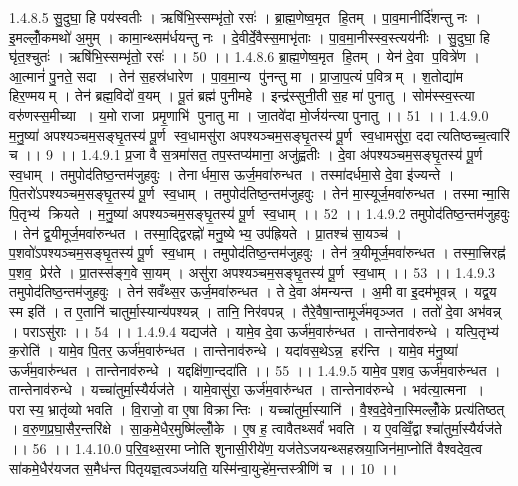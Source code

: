 1.4.8.5
सु॒दुघा॒ हि पय॑स्वतीः । ऋषि॑भि॒स्सम्भृ॑तो॒ रसः॑ । ब्रा॒ह्म॒णेष्व॒मृत॑ हि॒तम् । पा॒व॒मानीर्दि॑शन्तु नः । इ॒मल्लोँ॒कमथो॑ अ॒मुम् । कामा॒न्थ्सम॑र्धयन्तु नः । दे॒वीर्दे॒वैस्स॒माभृ॑ताः । पा॒व॒मा॒नीस्स्व॒स्त्यय॑नीः । सु॒दुघा॒ हि घृ॑त॒श्चुतः॑ । ऋषि॑भि॒स्सम्भृ॑तो॒ रसः॑ ।। 50 ।।
1.4.8.6
ब्रा॒ह्म॒णेष्व॒मृत॑ हि॒तम् । येन॑ दे॒वा प॒वित्रे॑ण । आ॒त्मानं॑ पु॒नते॒ सदा । तेन॑ स॒हस्र॑धारेण । पा॒व॒मा॒न्य पु॑नन्तु मा । प्रा॒जा॒प॒त्यं प॒वित्रम् । श॒तोद्या॑म हिर॒ण्मयम् । तेन॑ ब्रह्म॒विदो॑ व॒यम् । पू॒तं ब्रह्म॑ पुनीमहे । इन्द्र॑स्सुनी॒ती स॒ह मा॑ पुनातु । सोम॑स्स्व॒स्त्या वरु॑णस्स॒मीच्या । य॒मो राजा प्रमृ॒णाभि॑ पुनातु मा । जा॒तवे॑दा मो॒र्जय॑न्त्या पुनातु ।। 51 ।।
1.4.9.0
म॒नु॒ष्या॑ अपश्यञ्चम॒सङ्घृ॒तस्य॑ पू॒र्ण स्व॒धामसु॑रा अपश्यञ्चम॒सङ्घृ॒तस्य॑ पू॒र्ण स्व॒धामसु॑रा॒ ददात्यतिष्ठच्च॒त्वारि॑ च ।। 9 ।।
1.4.9.1
प्र॒जा वै स॒त्रमा॑सत॒ तप॒स्तप्य॑माना॒ अजु॑ह्वतीः । दे॒वा अ॑पश्यञ्चम॒सङ्घृ॒तस्य॑ पू॒र्ण स्व॒धाम् । तमुपोद॑तिष्ठ॒न्तम॑जुहवुः । तेनार्धमा॒स ऊर्ज॒मवा॑रुन्धत । तस्मा॑दर्धमा॒से दे॒वा इ॑ज्यन्ते । पि॒तरो॑ऽपश्यञ्चम॒सङ्घृ॒तस्य॑ पू॒र्ण स्व॒धाम् । तमुपोद॑तिष्ठ॒न्तम॑जुहवुः । तेन॑ मा॒स्यूर्ज॒मवा॑रुन्धत । तस्मान्मा॒सि पि॒तृभ्य॑ क्रियते । म॒नु॒ष्या॑ अपश्यञ्चम॒सङ्घृ॒तस्य॑ पू॒र्ण स्व॒धाम् ।। 52 ।।
1.4.9.2
तमुपोद॑तिष्ठ॒न्तम॑जुहवुः । तेन॑ द्व॒यीमूर्ज॒मवा॑रुन्धत । तस्मा॒द्द्विरह्नो॑ मनु॒ष्येभ्य॒ उप॑ह्रियते । प्रा॒तश्च॑ सा॒यञ्च॑ । प॒शवो॑ऽपश्यञ्चम॒सङ्घृ॒तस्य॑ पू॒र्ण स्व॒धाम् । तमुपोद॑तिष्ठ॒न्तम॑जुहवुः । तेन॑ त्र॒यीमूर्ज॒मवा॑रुन्धत । तस्मा॒त्त्रिरह्न॑ प॒शव॒ प्रेर॑ते । प्रा॒तस्स॑ङ्ग॒वे सा॒यम् । असु॑रा अपश्यञ्चम॒सङ्घृ॒तस्य॑ पू॒र्ण स्व॒धाम् ।। 53 ।।
1.4.9.3
तमुपोद॑तिष्ठ॒न्तम॑जुहवुः । तेन॑ सवँथ्स॒र ऊर्ज॒मवा॑रुन्धत । ते दे॒वा अ॑मन्यन्त । अ॒मी वा इ॒दम॑भूवन्न् । यद्व॒य स्म इति॑ । त ए॒तानि॑ चातुर्मा॒स्यान्य॑पश्यन्न् । तानि॒ निर॑वपन्न् । तैरे॒वैषा॒न्तामूर्ज॑मवृञ्जत । ततो॑ दे॒वा अभ॑वन्न् । पराऽसु॑राः ।। 54 ।।
1.4.9.4
यद्यज॑ते । यामे॒व दे॒वा ऊर्ज॑म॒वारु॑न्धत । तान्तेनाव॑रुन्धे । यत्पि॒तृभ्य॑ क॒रोति॑ । यामे॒व पि॒तर॒ ऊर्ज॑म॒वारु॑न्धत । तान्तेनाव॑रुन्धे । यदा॑वस॒थेऽन्न॒॒ हर॑न्ति । यामे॒व म॑नु॒ष्या॑ ऊर्ज॑म॒वारु॑न्धत । तान्तेनाव॑रुन्धे । यद्दक्षि॑णा॒न्ददा॑ति ।। 55 ।।
1.4.9.5
यामे॒व प॒शव॒ ऊर्ज॑म॒वारु॑न्धत । तान्तेनाव॑रुन्धे । यच्चा॑तुर्मा॒स्यैर्यज॑ते । यामे॒वासु॑रा॒ ऊर्ज॑म॒वारु॑न्धत । तान्तेनाव॑रुन्धे । भव॑त्या॒त्मना । परास्य॒ भ्रातृ॑व्यो भवति । वि॒राजो॒ वा ए॒षा विक्रान्तिः । यच्चा॑तुर्मा॒स्यानि॑ । वै॒श्व॒दे॒वेना॒स्मिल्लोँ॒के प्रत्य॑तिष्ठत् । व॒रु॒ण॒प्र॒घा॒सैर॒न्तरि॑क्षे । सा॒क॒मे॒धैर॒मुष्मि॑ल्लोँ॒के । ए॒ष ह॒ त्वावैतथ्सर्वं॑ भवति । य ए॒वव्विँ॒द्वाश्चा॑तुर्मा॒स्यैर्यज॑ते ।। 56 ।।
1.4.10.0
प॒रि॒व॒थ्स॒रमाप्नोति शुनासी॒रीये॑ण॒ यज॑तेऽजयन्थ्सहस्रया॒जिन॑मा॒प्नोति॑ वैश्वदेव॒त्व सा॑कमे॒धैर॑यजत स॒मैध॑न्त पितृयज्ञ॒त्वञ्ज॑यति॒ यस्मि॑न्वा॒युऱ्हे॑म॒न्तस्त्रीणि॑ च ।। 10 ।।
